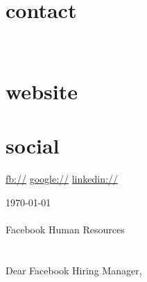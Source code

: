 \documentclass[]{fancy-cv}
\begin{document}

\begin{aside}
  \section{contact}
    \href{mailto:\myemail}{\myemail}
    ~
    \myphone
    ~
    \myaddress
    \mycity
  \section{website}
    \href{\mywebsite}{\mywebsite}
  \section{social}
    \href{http://facebook.com/\myfb}{fb://\myfb}
    \href{http://plug.google.com/\mygp}{google://\mygp}
    \href{http://www.linkedin.com/in/\mylinkedin}{linkedin://\mylinkedin}
\end{aside}

\vspace{.8em}
\large
\today\\
\\
Facebook Human Resources\\
\\
\\
Dear Facebook Hiring Manager,
\end{document}

